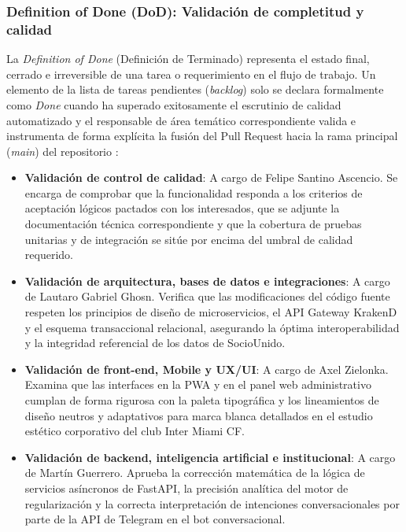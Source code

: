 \subsubsection{Definition of Done (DoD): Validación de completitud y calidad}

La \textit{Definition of Done} (Definición de Terminado) representa el estado final, cerrado e irreversible de una tarea o requerimiento en el flujo de trabajo. Un elemento de la lista de tareas pendientes (\textit{backlog}) solo se declara formalmente como \textit{Done} cuando ha superado exitosamente el escrutinio de calidad automatizado y el responsable de área temático correspondiente valida e instrumenta de forma explícita la fusión del Pull Request hacia la rama principal (\textit{main}) del repositorio :

\begin{itemize}
    \item \textbf{Validación de control de calidad}: A cargo de Felipe Santino Ascencio. Se encarga de comprobar que la funcionalidad responda a los criterios de aceptación lógicos pactados con los interesados, que se adjunte la documentación técnica correspondiente y que la cobertura de pruebas unitarias y de integración se sitúe por encima del umbral de calidad requerido.
    \item \textbf{Validación de arquitectura, bases de datos e integraciones}: A cargo de Lautaro Gabriel Ghosn. Verifica que las modificaciones del código fuente respeten los principios de diseño de microservicios, el API Gateway KrakenD y el esquema transaccional relacional, asegurando la óptima interoperabilidad y la integridad referencial de los datos de SocioUnido.
    \item \textbf{Validación de front-end, Mobile y UX/UI}: A cargo de Axel Zielonka. Examina que las interfaces en la PWA y en el panel web administrativo cumplan de forma rigurosa con la paleta tipográfica y los lineamientos de diseño neutros y adaptativos para marca blanca detallados en el estudio estético corporativo del club Inter Miami CF.
    \item \textbf{Validación de backend, inteligencia artificial e institucional}: A cargo de Martín Guerrero. Aprueba la corrección matemática de la lógica de servicios asíncronos de FastAPI, la precisión analítica del motor de regularización y la correcta interpretación de intenciones conversacionales por parte de la API de Telegram en el bot conversacional.
\end{itemize}

